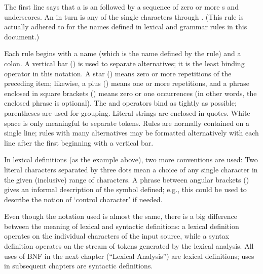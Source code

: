 The first line says that a  is an  followed by
a sequence of zero or more s and underscores.  An
 in turn is any of the single characters 
through .  (This rule is actually adhered to for the
names defined in lexical and grammar rules in this document.)

Each rule begins with a name (which is the name defined by the rule)
and a colon.  A vertical bar (\code{|}) is used to separate
alternatives; it is the least binding operator in this notation.  A
star (\code{*}) means zero or more repetitions of the preceding item;
likewise, a plus (\code{+}) means one or more repetitions, and a
phrase enclosed in square brackets (\code{[ ]}) means zero or one
occurrences (in other words, the enclosed phrase is optional).  The
\code{*} and \code{+} operators bind as tightly as possible;
parentheses are used for grouping.  Literal strings are enclosed in
quotes.  White space is only meaningful to separate tokens.
Rules are normally contained on a single line; rules with many
alternatives may be formatted alternatively with each line after the
first beginning with a vertical bar.

In lexical definitions (as the example above), two more conventions
are used: Two literal characters separated by three dots mean a choice
of any single character in the given (inclusive) range of \ASCII{}
characters.  A phrase between angular brackets () gives an
informal description of the symbol defined; e.g., this could be used
to describe the notion of `control character' if needed.

Even though the notation used is almost the same, there is a big
difference between the meaning of lexical and syntactic definitions:
a lexical definition operates on the individual characters of the
input source, while a syntax definition operates on the stream of
tokens generated by the lexical analysis.  All uses of BNF in the next
chapter (``Lexical Analysis'') are lexical definitions; uses in
subsequent chapters are syntactic definitions.
